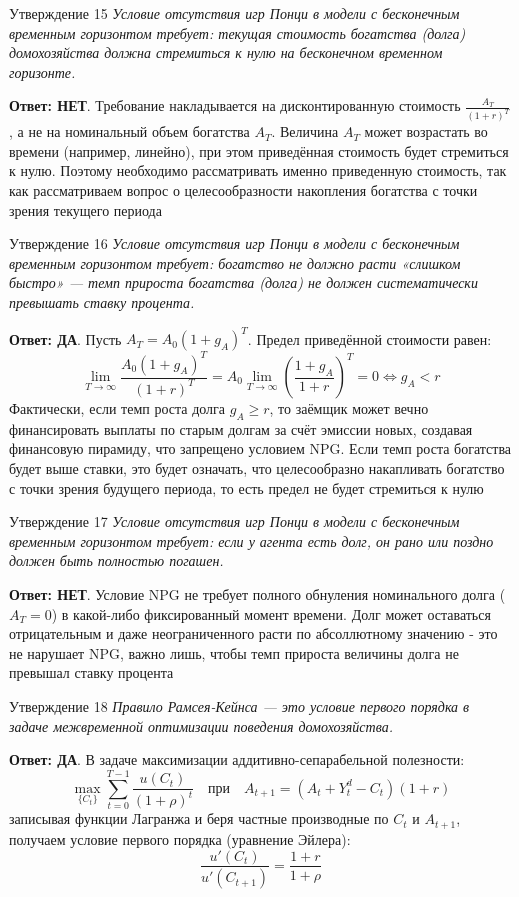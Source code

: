 \documentclass[10pt,a4paper]{article}
\newcommand{\qda}{\textbf{\color{yesgreen}Ответ: ДА}}
\newcommand{\qnet}{\textbf{\color{nored}Ответ: НЕТ}}
\newenvironment{answer}[2]{%
  \begin{qbox}{Утверждение #1}
  \textit{#2}\par\smallskip
}{%
  \end{qbox}\vspace{2pt}
}
\begin{document}
\begin{answer}{15}{Условие отсутствия игр Понци в модели с бесконечным временным горизонтом требует: текущая стоимость богатства (долга) домохозяйства должна стремиться к нулю на бесконечном временном горизонте.}
\qnet. Требование накладывается на дисконтированную стоимость $\frac{A_T}{(1+r)^T}$, а не на номинальный объем богатства $A_T$. Величина $A_T$ может возрастать во времени (например, линейно), при этом приведённая стоимость будет стремиться к нулю. Поэтому необходимо рассматривать именно приведенную стоимость, так как рассматриваем вопрос о
целесообразности накопления богатства с точки зрения текущего периода
\end{answer}

\begin{answer}{16}{Условие отсутствия игр Понци в модели с бесконечным временным горизонтом требует: богатство не должно расти «слишком быстро» — темп прироста богатства (долга) не должен систематически превышать ставку процента.}
\qda. Пусть $A_T = A_0 (1+g_A)^T$. Предел приведённой стоимости равен:
\[
\lim_{T \to \infty} \frac{A_0 (1+g_A)^T}{(1+r)^T} = A_0 \lim_{T \to \infty} \left(\frac{1+g_A}{1+r}\right)^T = 0 \iff g_A < r
\]
Фактически, если темп роста долга $g_A \ge r$, то заёмщик может вечно финансировать выплаты по старым долгам за счёт эмиссии новых, создавая финансовую пирамиду, что запрещено условием NPG. Если темп роста богатства будет выше ставки, это будет означать, что целесообразно накапливать богатство с точки зрения будущего периода, то есть предел не будет стремиться к нулю
\end{answer}

\begin{answer}{17}{Условие отсутствия игр Понци в модели с бесконечным временным горизонтом требует: если у агента есть долг, он рано или поздно должен быть полностью погашен.}
\qnet. Условие NPG не требует полного обнуления номинального долга ($A_T = 0$) в какой-либо фиксированный момент времени. Долг может оставаться отрицательным и даже неограниченного расти по абсоллютному значению - это не нарушает NPG, важно лишь, чтобы темп прироста величины долга не превышал ставку процента
\end{answer}

\begin{answer}{18}{Правило Рамсея-Кейнса — это условие первого порядка в задаче межвременной оптимизации поведения домохозяйства.}
\qda. В задаче максимизации аддитивно-сепарабельной полезности:
\[
\max_{\{C_t\}} \sum_{t=0}^{T-1} \frac{u(C_t)}{(1+\rho)^t} \quad \text{при} \quad A_{t+1} = (A_t + Y_t^d - C_t)(1+r)
\]
записывая функции Лагранжа и беря частные производные по $C_t$ и $A_{t+1}$, получаем условие первого порядка (уравнение Эйлера):
\[
\frac{u'(C_t)}{u'(C_{t+1})} = \frac{1+r}{1+\rho}
\]
\end{answer}
\end{document}

